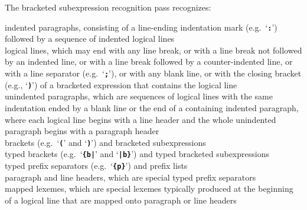 \documentclass[12pt]{article}
\newcommand{\TT}[1]{{\tt \bfseries #1}}
\newenvironment{indpar}[1][0.3in]%
	{\begin{list}{}%
		     {\setlength{\itemsep}{0in}%
		      \setlength{\topsep}{0in}%
		      \setlength{\parsep}{1ex}%
		      \setlength{\labelwidth}{#1}%
		      \setlength{\leftmargin}{#1}%
		      \addtolength{\leftmargin}{\labelsep}}%
	 \item}%
	{\end{list}}
\begin{document}
The bracketed subexpression recognition pass recognizes:
\begin{indpar}[0.5in]
\hspace*{-0.2in}indented paragraphs, consisting of a line-ending
    indentation mark (e.g.~`\TT{:}') followed by a sequence of
    indented logical lines \\
\hspace*{-0.2in}logical lines, which may end with any line break,
    or with a line break not followed by an indented line,
    or with a line break followed by a counter-indented line,
    or with a line separator (e.g.~`\TT{;}'),
    or with any blank line, or with the closing bracket
    (e.g., `\TT{)}') of
    a bracketed expression that contains the logical line \\
\hspace*{-0.2in}unindented paragraphs,
    which are sequences of logical lines with the same indentation
    ended by a blank line or the end of a containing indented paragraph,
    where each logical line begins with a line header and
    the whole unindented paragraph begins with a paragraph
    header \\
\hspace*{-0.2in}brackets (e.g.~`\TT{(}' and `\TT{)}')
    and bracketed subexpressions \\
\hspace*{-0.2in}typed brackets (e.g.~`\TT{\{b|}' and `\TT{|b\}}')
    and typed bracketed subexpressions \\
\hspace*{-0.2in}typed prefix separators (e.g.~`\TT{\{p\}}')
    and prefix lists \\
\hspace*{-0.2in}paragraph and line headers, which are special typed prefix
    separators \\
\hspace*{-0.2in}mapped lexemes, which are special lexemes typically
    produced at the beginning of a logical line that are mapped onto
    paragraph or line headers
\end{indpar}
\end{document}
